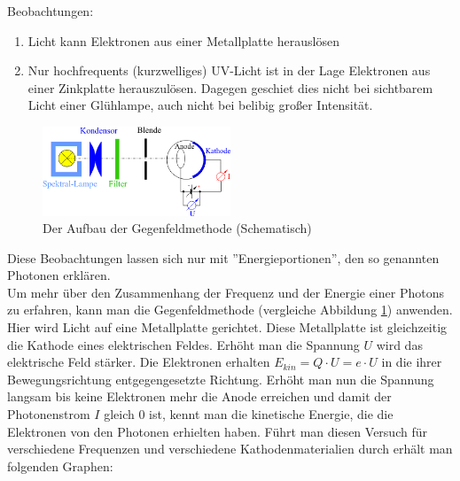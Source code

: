 \documentclass[a4paper]{article}
\begin{document}
				Beobachtungen:
				\begin{enumerate}
					\item Licht kann Elektronen aus einer Metallplatte herauslösen
					\item Nur hochfrequents (kurzwelliges) UV-Licht ist in der Lage Elektronen aus einer Zinkplatte herauszulösen. Dagegen geschiet dies nicht bei sichtbarem Licht einer Glühlampe, auch nicht bei belibig großer Intensität.
				\end{enumerate}
				\begin{figure}[H]
					\centering
					\includegraphics[width=0.5\textwidth]{img/gegenfeld03_quantenobjektp_ver.png}
					\caption{Der Aufbau der Gegenfeldmethode (Schematisch)}
					\label{img:gegenfeld03_quantenobjektp_ver}
				\end{figure}
				Diese Beobachtungen lassen sich nur mit ''Energieportionen'', den so genannten Photonen erklären. \\
				Um mehr über den Zusammenhang der Frequenz und der Energie einer Photons zu erfahren, kann man die Gegenfeldmethode (vergleiche Abbildung \ref{img:gegenfeld03_quantenobjektp_ver}) anwenden. Hier wird Licht auf eine Metallplatte gerichtet. Diese Metallplatte ist gleichzeitig die Kathode eines elektrischen Feldes. Erhöht man die Spannung $U$ wird das elektrische Feld stärker. Die Elektronen erhalten $E_{kin}=Q\cdot U = e\cdot U$ in die ihrer Bewegungsrichtung entgegengesetzte Richtung. Erhöht man nun die Spannung langsam bis keine Elektronen mehr die Anode erreichen und damit der Photonenstrom $I$ gleich $0$ ist, kennt man die kinetische Energie, die die Elektronen von den Photonen erhielten haben. Führt man diesen Versuch für verschiedene Frequenzen und verschiedene Kathodenmaterialien durch erhält man folgenden Graphen:
				
\end{document}
